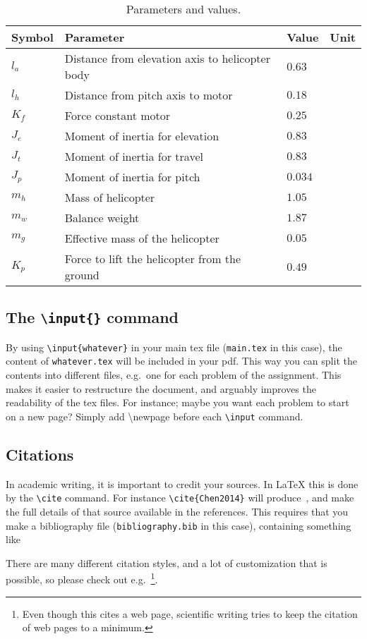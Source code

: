 \begin{table}[tbp]
	\centering
	\caption{Parameters and values.}
	\begin{tabular}{llll}
		\hline
		Symbol & Parameter & Value & Unit \\
		\hline
		$l_a$ & Distance from elevation axis to helicopter body & $0.63$ & \meter \\
		$l_h$ & Distance from pitch axis to motor & $0.18$ & \meter \\
		$K_f$ & Force constant motor & $0.25$ & \newton\per\volt \\
		$J_e$ & Moment of inertia for elevation & $0.83$ & \kilogram\usk\meter\squared \\
		$J_t$ & Moment of inertia for travel & $0.83$ & \kilogram\usk\meter\squared \\
		$J_p$ & Moment of inertia for pitch & $0.034$ & \kilogram\usk\meter\squared \\
		$m_h$ & Mass of helicopter & $1.05$ & \kilogram \\
		$m_w$ & Balance weight & $1.87$ & \kilogram \\
		$m_g$ & Effective mass of the helicopter & $0.05$ & \kilogram \\
		$K_p$ & Force to lift the helicopter from the ground & $0.49$ & \newton \\
		\hline
	\end{tabular}
	\label{tab:parameters}
\end{table}


\subsection{The \texttt{\textbackslash{input}\{\}} command}
By using \texttt{\textbackslash{input}\{whatever\}} in your main tex file (\texttt{main.tex} in this case), the content of \texttt{whatever.tex} will be included in your pdf. This way you can split the contents into different files, e.g.~one for each problem of the assignment. This makes it easier to restructure the document, and arguably improves the readability of the tex files. For instance; maybe you want each problem to start on a new page? Simply add \textbackslash{newpage} before each \texttt{\textbackslash{input}} command.

\subsection{Citations}
In academic writing, it is important to credit your sources. In \LaTeX{} this is done by the \texttt{\textbackslash{cite}} command. For instance \texttt{\textbackslash{cite}\{Chen2014\}} will produce~\cite{Chen2014}, and make the full details of that source available in the references. This requires that you make a bibliography file (\texttt{bibliography.bib} in this case), containing something like


There are many different citation styles, and a lot of customization that is possible, so please check out e.g.~\cite{WikibookLatex}\footnote{Even though this cites a web page, scientific writing tries to keep the citation of web pages to a minimum.}.


